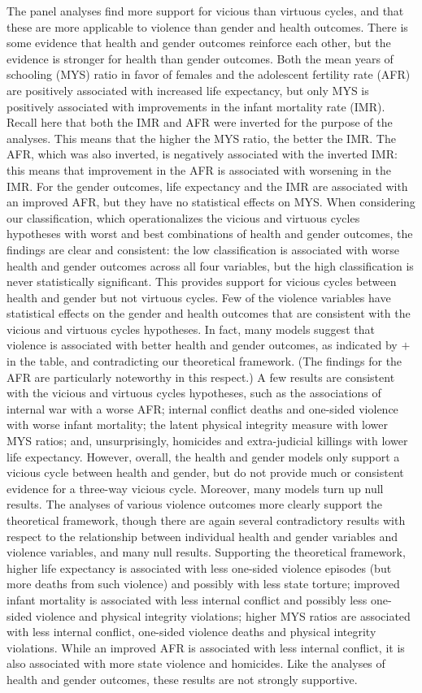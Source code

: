 \documentclass[12pt]{article}
\begin{document}
The panel analyses find more support for vicious than virtuous cycles, and that these are more applicable to violence than gender and health outcomes.
There is some evidence that health and gender outcomes reinforce each other, but the evidence is stronger for health than gender outcomes. Both the mean years of schooling (MYS) ratio in favor of females and the adolescent fertility rate (AFR) are positively associated with increased life expectancy, but only MYS is positively associated with improvements in the infant mortality rate (IMR). Recall here that both the IMR and AFR were inverted for the purpose of the analyses. This means that the higher the MYS ratio, the better the IMR. The AFR, which was also inverted, is negatively associated with the inverted IMR: this means that improvement in the AFR is associated with worsening in the IMR. For the gender outcomes, life expectancy and the IMR are associated with an improved AFR, but they have no statistical effects on MYS. When considering our classification, which operationalizes the vicious and virtuous cycles hypotheses with worst and best combinations of health and gender outcomes, the findings are clear and consistent: the low classification is associated with worse health and gender outcomes across all four variables, but the high classification is never statistically significant. This provides support for vicious cycles between health and gender but not virtuous cycles.
Few of the violence variables have statistical effects on the gender and health outcomes that are  consistent with the vicious and virtuous cycles hypotheses. In fact, many models suggest that violence is associated with better health and gender outcomes, as indicated by   $+$ in the table, and contradicting our theoretical framework. (The findings for the AFR are particularly noteworthy in this respect.) A few results are consistent with the vicious and virtuous cycles hypotheses, such as the associations of internal war with a worse AFR; internal conflict deaths and one-sided violence with worse infant mortality; the latent physical integrity measure with lower MYS ratios; and, unsurprisingly, homicides and extra-judicial killings with lower life expectancy. However, overall, the health and gender models only support a vicious cycle between health and gender, but do not provide much or consistent evidence for a three-way vicious cycle. Moreover, many models turn up null results.
The analyses of various violence outcomes more clearly support the theoretical framework, though there are again several contradictory results with respect to the relationship between individual health and gender variables and violence variables, and many null results. Supporting the theoretical framework, higher life expectancy is associated with less one-sided violence episodes (but more deaths from such violence) and possibly with less state torture; improved infant mortality is associated with less internal conflict and possibly less one-sided violence and physical integrity violations; higher MYS ratios are associated with less internal conflict, one-sided violence deaths and physical integrity violations. While an improved AFR is associated with less internal conflict, it is also associated with more state violence and homicides. Like the analyses of health and gender outcomes, these results are not strongly supportive.
\end{document}
